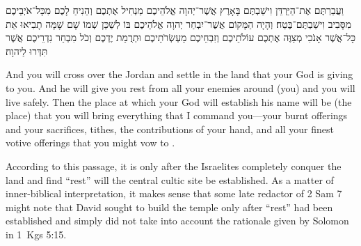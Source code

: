 \begin{hebrewtext}
    וַעֲבַרְתֶּם אֶת־הַיַּרְדֵּן וִישַׁבְתֶּם בָּאָרֶץ אֲשֶׁר־יְהוָה אֱלֹהֵיכֶם מַנְחִיל אֶתְכֶם וְהֵנִיחַ לָכֶם מִכָּל־אֹיְבֵיכֶם מִסָּבִיב וִישַׁבְתֶּם־בֶּטַח׃ 
    וְהָיָה הַמָּקוֹם אֲשֶׁר־יִבְחַר יְהוָה אֱלֹהֵיכֶם בּוֹ לְשַׁכֵּן שְׁמוֹ שָׁם שָׁמָּה תָבִיאוּ אֵת כָּל־אֲשֶׁר אָנֹכִי מְצַוֶּה אֶתְכֶם עוֹלֹתֵיכֶם וְזִבְחֵיכֶם מַעְשְׂרֹתֵיכֶם וּתְרֻמַת יֶדְכֶם וְכֹל מִבְחַר נִדְרֵיכֶם אֲשֶׁר תִּדְּרוּ לַיהוָה׃
\end{hebrewtext}
\begin{translation}
    And you will cross over the Jordan and settle in the land that \yahweh your God is giving to you. And he will give you rest from all your enemies around (you) and you will live safely.
    Then the place at which \yahweh your God will establish his name will be (the place) that you will bring everything that I command you---your burnt offerings and your sacrifices, tithes, the contributions of your hand, and all your finest votive offerings that you might vow to \yahweh.
\end{translation}
\noindent
According to this passage, it is only after the Israelites completely conquer the land and find ``rest'' will the central cultic site be established.  As a matter of inner-biblical interpretation, it makes sense that some late redactor of 2 Sam 7 might note that David sought to build the temple only after ``rest'' had been established and simply did not take into account the rationale given by Solomon in 1~Kgs 5:15.

